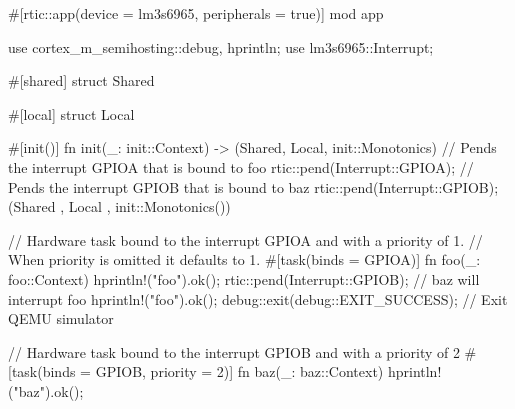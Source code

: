 #[rtic::app(device = lm3s6965, peripherals = true)]
mod app {
    use cortex_m_semihosting::{debug, hprintln};
    use lm3s6965::Interrupt;

    #[shared]
    struct Shared {}

    #[local]
    struct Local {}

    #[init()]
    fn init(_: init::Context) -> (Shared, Local, init::Monotonics) {
        // Pends the interrupt GPIOA that is bound to foo
        rtic::pend(Interrupt::GPIOA);
        // Pends the interrupt GPIOB that is bound to baz
        rtic::pend(Interrupt::GPIOB);
        (Shared {}, Local {}, init::Monotonics())
    }

    // Hardware task bound to the interrupt GPIOA and with a priority of 1.
    // When priority is omitted it defaults to 1.
    #[task(binds = GPIOA)]
    fn foo(_: foo::Context){
        hprintln!("foo").ok();
        rtic::pend(Interrupt::GPIOB); // baz will interrupt foo
        hprintln!("foo").ok();
        debug::exit(debug::EXIT_SUCCESS); // Exit QEMU simulator
    }

    // Hardware task bound to the interrupt GPIOB and with a priority of 2
    #[task(binds = GPIOB, priority = 2)]
    fn baz(_: baz::Context){
        hprintln!("baz").ok();
    }
}
